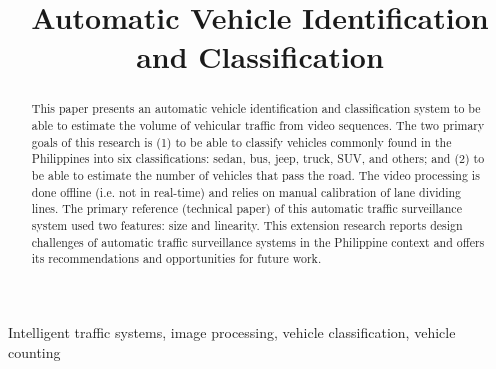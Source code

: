 \documentclass[conference]{IEEEtran}
\begin{document}
%
\title{Automatic Vehicle Identification and Classification}


\author{

}

\maketitle


\begin{abstract}
This paper presents an automatic vehicle identification and classification system to be able to estimate the volume of vehicular traffic from video sequences. The two primary goals of this research is (1) to be able to classify vehicles commonly found in the Philippines into six classifications: sedan, bus, jeep, truck, SUV, and others; and (2) to be able to estimate the number of vehicles that pass the road. The video processing is done offline (i.e. not in real-time) and relies on manual calibration of lane dividing lines. The primary reference (technical paper) of this automatic traffic surveillance system used two features: size and linearity. This extension research reports design challenges of automatic traffic surveillance systems in the Philippine context and offers its recommendations and opportunities for future work.
\end{abstract}

\begin{IEEEkeywords}
Intelligent traffic systems, image processing, vehicle classification, vehicle counting
\end{IEEEkeywords}
\end{document}
